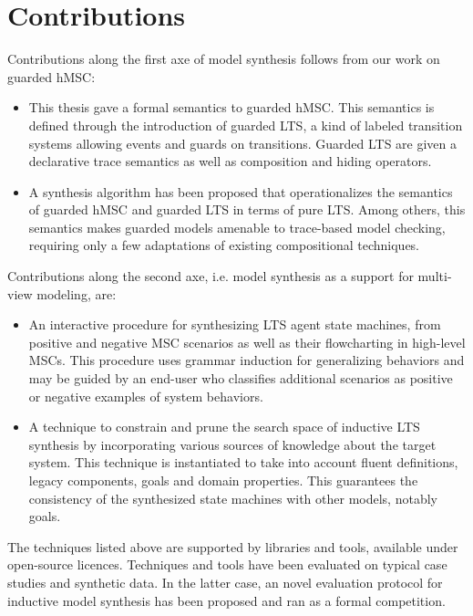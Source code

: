 \section{Contributions\label{section:conclusion-contributions}}

Contributions along the first axe of model synthesis follows from our work on guarded hMSC:

\begin{itemize}

\item This thesis gave a formal semantics to guarded hMSC. This semantics is defined through the introduction of guarded LTS, a kind of labeled transition systems allowing events and guards on transitions. Guarded LTS are given a declarative trace semantics as well as composition and hiding operators.

\item A synthesis algorithm has been proposed that operationalizes the semantics of guarded hMSC and guarded LTS in terms of pure LTS. Among others, this semantics makes guarded models amenable to trace-based model checking, requiring only a few adaptations of existing compositional techniques.

\end{itemize}

Contributions along the second axe, i.e. model synthesis as a support for multi-view modeling, are:

\begin{itemize}

\item An interactive procedure for synthesizing LTS agent state machines, from positive and negative MSC scenarios as well as their flowcharting in high-level MSCs. This procedure uses grammar induction for generalizing behaviors and may be guided by an end-user who classifies additional scenarios as positive or negative examples of system behaviors.

\item A technique to constrain and prune the search space of inductive LTS synthesis by incorporating various sources of knowledge about the target system. This technique is instantiated to take into account fluent definitions, legacy components, goals and domain properties. This guarantees the consistency of the synthesized state machines with other models, notably goals. 

\end{itemize}

The techniques listed above are supported by libraries and tools, available under open-source licences. Techniques and tools have been evaluated on typical case studies and synthetic data. In the latter case, an novel evaluation protocol for inductive model synthesis has been proposed and ran as a formal competition.
